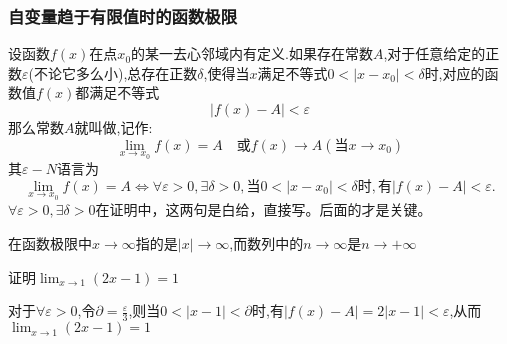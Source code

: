 \documentclass[12pt, a4paper, oneside, UTF8]{ctexbook}  %
\begin{document}
\subsubsection{自变量趋于有限值时的函数极限}
\begin{defn}{}{}
    设函数$f(x)$在点$x_0$的某一去心邻域内有定义.如果存在常数$A$,对于任意给定的正数$\varepsilon$(不论它多么小),总存在正数$\delta$,使得当$x$满足不等式$0<|x-x_0|<\delta$时,对应的函数值$f(x)$都满足不等式
    $$
        |f(x)-A|<\varepsilon
    $$
    那么常数$A$就叫做,记作:
    $$
        \lim_{x\to x_0}f(x)=A\quad\text{或}f(x)\to A(\text{当}x\to x_0)
    $$
    其$\varepsilon-N$语言为
    $$
        \lim_{x\to x_0}f(x)=A\Leftrightarrow\forall\varepsilon>0,\exists\delta>0,\text{当}0<|x-x_0|<\delta\text{时},\text{有}|f(x)-A|<\varepsilon.
    $$
    $\forall\varepsilon>0,\exists\delta>0$在证明中，这两句是白给，直接写。后面的才是关键。
\end{defn}
\begin{criterion}{}{}
    在函数极限中$x \to \infty$指的是$|x| \to \infty$,而数列中的$n \to \infty$是$n \to +\infty$
\end{criterion}
\begin{problem}
证明$\operatorname*{lim}_{x\to1}(2x-1)=1$
\end{problem}
\begin{solution}
    对于$\forall \varepsilon > 0$,令$\partial = \frac{\varepsilon}{3}$,则当$0<|x-1|<\partial$时,有$|f(x)-A|=2|x-1|<\varepsilon$,从而$\operatorname*{lim}_{x\to1}(2x-1)=1$
\end{solution}
\end{document}
